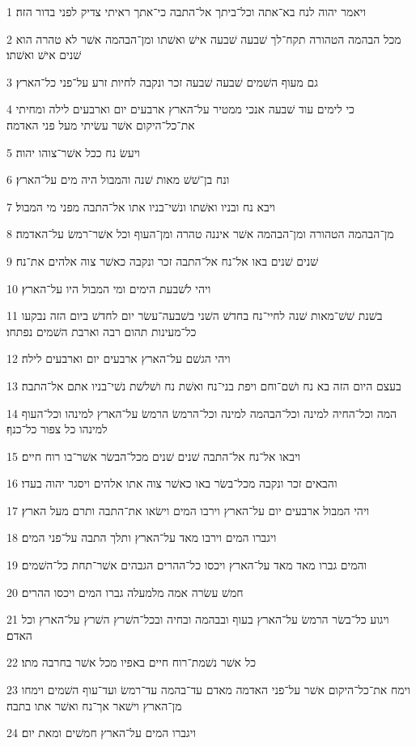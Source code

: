 \par 1 ויאמר יהוה לנח בא־אתה וכל־ביתך אל־התבה כי־אתך ראיתי צדיק לפני בדור הזה׃
\par 2 מכל הבהמה הטהורה תקח־לך שׁבעה שׁבעה אישׁ ואשׁתו ומן־הבהמה אשׁר לא טהרה הוא שׁנים אישׁ ואשׁתו׃
\par 3 גם מעוף השׁמים שׁבעה שׁבעה זכר ונקבה לחיות זרע על־פני כל־הארץ׃
\par 4 כי לימים עוד שׁבעה אנכי ממטיר על־הארץ ארבעים יום וארבעים לילה ומחיתי את־כל־היקום אשׁר עשׂיתי מעל פני האדמה׃
\par 5 ויעשׂ נח ככל אשׁר־צוהו יהוה׃
\par 6 ונח בן־שׁשׁ מאות שׁנה והמבול היה מים על־הארץ׃
\par 7 ויבא נח ובניו ואשׁתו ונשׁי־בניו אתו אל־התבה מפני מי המבול׃
\par 8 מן־הבהמה הטהורה ומן־הבהמה אשׁר איננה טהרה ומן־העוף וכל אשׁר־רמשׂ על־האדמה׃
\par 9 שׁנים שׁנים באו אל־נח אל־התבה זכר ונקבה כאשׁר צוה אלהים את־נח׃
\par 10 ויהי לשׁבעת הימים ומי המבול היו על־הארץ׃
\par 11 בשׁנת שׁשׁ־מאות שׁנה לחיי־נח בחדשׁ השׁני בשׁבעה־עשׂר יום לחדשׁ ביום הזה נבקעו כל־מעינות תהום רבה וארבת השׁמים נפתחו׃
\par 12 ויהי הגשׁם על־הארץ ארבעים יום וארבעים לילה׃
\par 13 בעצם היום הזה בא נח ושׁם־וחם ויפת בני־נח ואשׁת נח ושׁלשׁת נשׁי־בניו אתם אל־התבה׃
\par 14 המה וכל־החיה למינה וכל־הבהמה למינה וכל־הרמשׂ הרמשׂ על־הארץ למינהו וכל־העוף למינהו כל צפור כל־כנף׃
\par 15 ויבאו אל־נח אל־התבה שׁנים שׁנים מכל־הבשׂר אשׁר־בו רוח חיים׃
\par 16 והבאים זכר ונקבה מכל־בשׂר באו כאשׁר צוה אתו אלהים ויסגר יהוה בעדו׃
\par 17 ויהי המבול ארבעים יום על־הארץ וירבו המים וישׂאו את־התבה ותרם מעל הארץ׃
\par 18 ויגברו המים וירבו מאד על־הארץ ותלך התבה על־פני המים׃
\par 19 והמים גברו מאד מאד על־הארץ ויכסו כל־ההרים הגבהים אשׁר־תחת כל־השׁמים׃
\par 20 חמשׁ עשׂרה אמה מלמעלה גברו המים ויכסו ההרים׃
\par 21 ויגוע כל־בשׂר הרמשׂ על־הארץ בעוף ובבהמה ובחיה ובכל־השׁרץ השׁרץ על־הארץ וכל האדם׃
\par 22 כל אשׁר נשׁמת־רוח חיים באפיו מכל אשׁר בחרבה מתו׃
\par 23 וימח את־כל־היקום אשׁר על־פני האדמה מאדם עד־בהמה עד־רמשׂ ועד־עוף השׁמים וימחו מן־הארץ וישׁאר אך־נח ואשׁר אתו בתבה׃
\par 24 ויגברו המים על־הארץ חמשׁים ומאת יום׃


